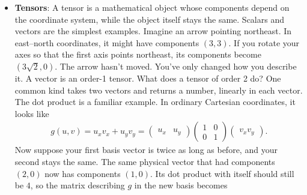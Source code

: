 \documentclass{report}
\begin{document}
\begin{itemize}
            \bigbreak \noindent 
            The fundamental-matrix method for reconstructing the scene is very simple, consisting of the following steps
            \begin{enumerate}[label=(\roman*)]
                \item Given several point correspondences $\mathbf{x}_{i}\leftrightarrow \mathbf{x}_{i}'$ across two views, form linear equations in the entries of F based on the coplanarity equations $\mathbf{x}_{i}'^{\mathsf{T}}\mathtt{F}\mathbf{x}_{i}=0$. 
               \item Find $F$ as the solution to a set of linear equations. 
               \item Compute a pair of camera matrices from $F$ 
               \item Given the two cameras $(\mathtt{P}, \mathtt{P}')$ and the corresponding image point pairs $\mathbf{x}_{i}\leftrightarrow \mathbf{x}_{i}'$, find the 3D point X${}_{i}$ that projects to the given image points. Solving for X in this way is known as triangulation 
            \end{enumerate}
        \item \textbf{Tensors}: A tensor is a mathematical object whose components depend on the coordinate system, while the object itself stays the same. Scalars and vectors are the simplest examples.
            \bigbreak \noindent 
            Imagine an arrow pointing northeast. In east–north coordinates, it might have components \((3,3)\). If you rotate your axes so that the first axis points northeast, its components become \((3\sqrt{2},0)\). The arrow hasn’t moved. You’ve only changed how you describe it. A vector is an order-1 tensor.
            \bigbreak \noindent 
            What does a tensor of order 2 do? One common kind takes two vectors and returns a number, linearly in each vector. The dot product is a familiar example. In ordinary Cartesian coordinates, it looks like
            \begin{align*}
                g(u,v) = u_{x}v_{x} + u_{y}v_{y} = \begin{pmatrix} u_{x} & u_{y} \end{pmatrix} \begin{pmatrix} 1 & 0 \\ 0 & 1 \end{pmatrix}\begin{pmatrix} v_{x}v_{y} \end{pmatrix}
            .\end{align*}
            Now suppose your first basis vector is twice as long as before, and your second stays the same. The same physical vector that had components \((2,0)\) now has components \((1,0)\). Its dot product with itself should still be \(4\), so the matrix describing \(g\) in the new basis becomes

\end{itemize}
\end{document}
